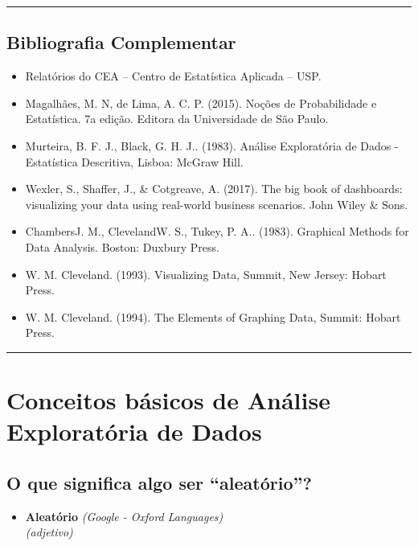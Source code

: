 \documentclass[
]{book}
\providecommand{\tightlist}{%
  \setlength{\itemsep}{0pt}\setlength{\parskip}{0pt}}
\begin{document}
\begin{center}\rule{0.5\linewidth}{0.5pt}\end{center}

\section{Bibliografia Complementar}\label{bibliografia-complementar}

\begin{itemize}
\item
  Relatórios do CEA -- Centro de Estatística Aplicada -- USP.
\item
  Magalhães, M. N, de Lima, A. C. P. (2015). Noções de Probabilidade e Estatística. 7a edição. Editora da Universidade de São Paulo.
\item
  Murteira, B. F. J., Black, G. H. J.. (1983). Análise Exploratória de Dados - Estatística Descritiva, Lisboa: McGraw Hill.
\item
  Wexler, S., Shaffer, J., \& Cotgreave, A. (2017). The big book of dashboards: visualizing your data using real-world business scenarios. John Wiley \& Sons.
\item
  ChambersJ. M., ClevelandW. S., Tukey, P. A.. (1983). Graphical Methods for Data Analysis. Boston: Duxbury Press.
\item
  W. M. Cleveland. (1993). Visualizing Data, Summit, New Jersey: Hobart Press.
\item
  W. M. Cleveland. (1994). The Elements of Graphing Data, Summit: Hobart Press.
\end{itemize}

\begin{center}\rule{0.5\linewidth}{0.5pt}\end{center}

\chapter{Conceitos básicos de Análise Exploratória de Dados}\label{conceitos_aed1}

\section{O que significa algo ser ``aleatório''?}\label{o-que-significa-algo-ser-aleatuxf3rio}

\begin{itemize}
\tightlist
\item
  \textbf{Aleatório} \emph{(Google - Oxford Languages)}\\
  \emph{(adjetivo)}\\
\end{itemize}
\end{document}
